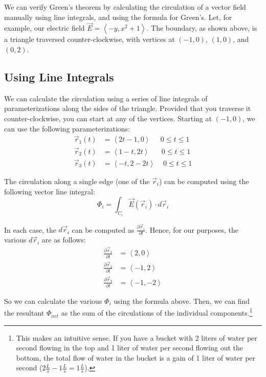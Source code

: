 \documentclass[11pt,English]{article}
\begin{document}
We can verify Green's theorem by calculating the circulation of a vector field manually using line integrals, and using the formula for Green's. Let, for example, our electric field $\vec{E} = \left< -y, x^2+1 \right>$. The boundary, as shown above, is a triangle traversed counter-clockwise, with vertices at $\left( -1, 0 \right)$, $\left( 1, 0 \right)$, and $\left(0, 2\right)$.

\subsection{Using Line Integrals}
We can calculate the circulation using a series of line integrals of parameterizations along the sides of the triangle. Provided that you traverse it counter-clockwise, you can start at any of the vertices. Starting at $\left(-1, 0\right)$, we can use the following parameterizations:
\begin{align}
\vec{r}_1(t) &= \left<2t-1, 0\right> \;\;\;\;\; 0 \leq t \leq 1 \\
\vec{r}_2(t) &= \left<1-t, 2t\right> \;\;\;\;\;\; 0 \leq t \leq 1 \\
\vec{r}_3(t) &= \left<-t, 2-2t\right> \;\;\;\; 0 \leq t \leq 1
\end{align}

The circulation along a single edge (one of the $\vec{r}_i$) can be computed using the following vector line integral:
$$
\Phi_i = \int_{C_i} \vec{E}(\vec{r}_i) \cdot d\vec{r}_i
$$

In each case, the $d\vec{r}_i$ can be computed as $\frac{\partial\vec{r}_i}{\partial t}$. Hence, for our purposes, the various $d\vec{r}_i$ are as follows:
\begin{align}
    \frac{\partial\vec{r}_1}{\partial t} &= \left<2, 0\right> \\
    \frac{\partial\vec{r}_2}{\partial t} &= \left<-1, 2\right> \\
    \frac{\partial\vec{r}_3}{\partial t} &= \left<-1, -2\right>
\end{align}

So we can calculate the various $\Phi_i$ using the formula above. Then, we can find the resultant $\Phi_{net}$ as the sum of the circulations of the individual components.\footnote{This makes an intuitive sense. If you have a bucket with 2 liters of water per second flowing in the top and 1 liter of water per second flowing out the bottom, the total flow of water in the bucket is a gain of 1 liter of water per second ($2 \frac{L}{s} - 1 \frac{L}{s} = 1 \frac{L}{s}$).}
\end{document}
